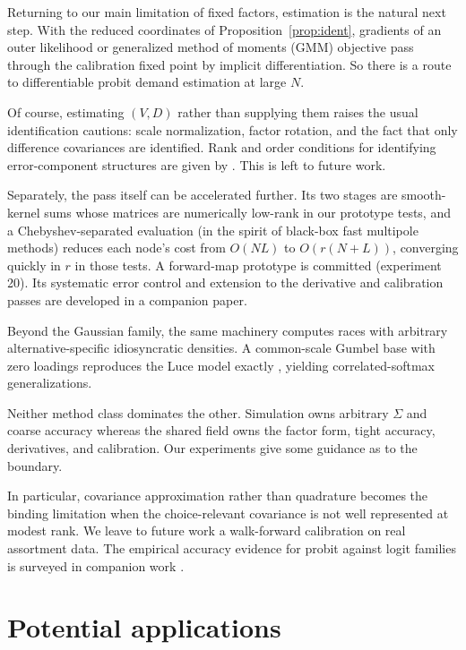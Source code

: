 \documentclass[12pt]{article}
\theoremstyle{remark}
\begin{document}
Returning to our main limitation of fixed factors, estimation is the natural next step. With the reduced coordinates of
Proposition~\ref{prop:ident}, gradients of an outer likelihood or generalized method of moments
(GMM) objective pass through the calibration fixed point by implicit
differentiation. So there is a route to differentiable probit demand estimation at large
$N$. 

Of course, estimating $(V, D)$ rather than supplying them raises the usual
identification cautions: scale normalization, factor rotation, and the fact
that only difference covariances are identified. Rank and order
conditions for identifying error-component structures are given by
\citet{walker2007}. This is left to future work. 

Separately, the pass itself can be accelerated further. Its two stages
are smooth-kernel sums whose matrices are numerically low-rank in our
prototype tests, and a
Chebyshev-separated evaluation (in the spirit of black-box fast multipole methods) reduces
each node's cost from $O(NL)$ to $O(r(N+L))$, converging quickly in
$r$ in those tests. A forward-map prototype is committed (experiment 20). Its systematic
error control and extension to the derivative and calibration passes are
developed in a companion paper.

Beyond the Gaussian family, the same machinery computes races with arbitrary
alternative-specific idiosyncratic densities. A common-scale Gumbel base with
zero loadings reproduces the Luce model exactly
\citep{luce1959,yellott1977}, yielding correlated-softmax
generalizations.

Neither method class dominates the other. Simulation owns arbitrary
$\Sigma$ and coarse accuracy whereas the shared field owns the factor form,
tight accuracy, derivatives, and calibration. Our experiments give some guidance as to the boundary. 

In particular, covariance approximation rather than quadrature
becomes the binding limitation when the choice-relevant covariance is
not well represented at modest rank. We leave to future work a
walk-forward calibration on real assortment data. The empirical
accuracy evidence for probit against logit families is surveyed in
companion work \citep{cottonsurvey}.

\section{Potential applications}\label{sec:applications}
\end{document}
